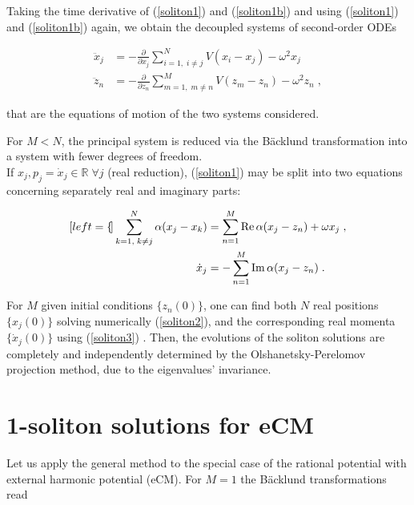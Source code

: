 \begin{obs}
Taking the time derivative of (\ref{soliton1}) and (\ref{soliton1b}) and using (\ref{soliton1}) and (\ref{soliton1b}) again, we obtain the decoupled systems of second-order ODEs

\begin{subequations}
\begin{align}
    \ddot x_j &= - \frac{\partial }{\partial x_j} \sum_{i = 1,\; i \neq j}^N V(x_i - x_j) - \omega^2 x_j \\
    \ddot z_n &= - \frac{\partial }{\partial z_n} \sum_{m = 1,\; m \neq n}^M V(z_m - z_n) - \omega^2 z_n\;,
\end{align}
\end{subequations}

that are the equations of motion of the two systems considered. 
\end{obs}

For $M < N$, the principal system is reduced via the Bäcklund transformation into a system with fewer degrees of freedom. \\
If $x_j, p_j = \dot x_j \in \mathbb{R} \;\forall j$ (real reduction), (\ref{soliton1}) may be split into two equations concerning separately real and imaginary parts:

\begin{subequations}
\begin{align}[left=\empheqlbrace]
    \sum_{k=1,\;k \neq j}^N \alpha (x_j - x_k) &= \sum_{n=1}^M \operatorname{Re}{\alpha(x_j - z_n)} + \omega x_j \label{soliton2}\;, \\
    \dot x_j &= - \sum_{n = 1}^M \operatorname{Im}{\alpha(x_j - z_n)} \label{soliton3}\;.
\end{align}
\end{subequations}

For $M$ given initial conditions $\{z_n(0)\}$, one can find both $N$ real positions $\{x_j(0)\}$ solving numerically (\ref{soliton2}), and the corresponding real momenta $\{\dot x_j(0)\}$ using (\ref{soliton3}) \cite{philip2019soliton}. Then, the evolutions of the soliton solutions are completely and independently determined by the Olshanetsky-Perelomov projection method, due to the eigenvalues' invariance.

\section{1-soliton solutions for eCM}
Let us apply the general method to the special case of the rational potential with external harmonic potential (eCM). For $M = 1$ the Bäcklund transformations read

